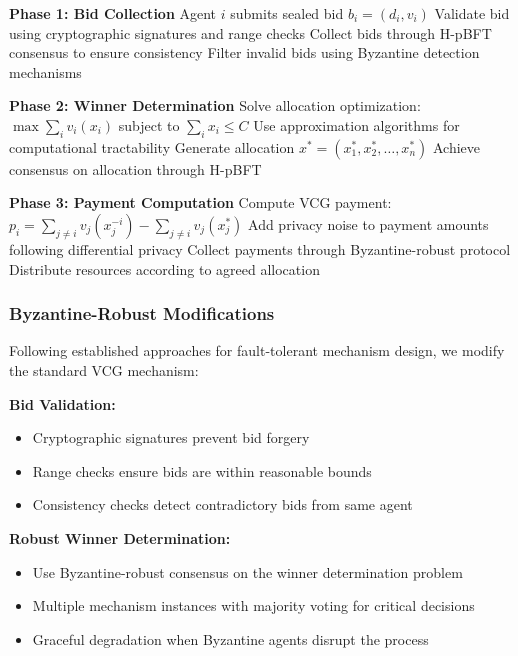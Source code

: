 \documentclass[conference]{IEEEtran}
\begin{document}
\begin{algorithmic}[1]
\STATE \textbf{Phase 1: Bid Collection}
    \STATE Agent $i$ submits sealed bid $b_i = (d_i, v_i)$
    \STATE Validate bid using cryptographic signatures and range checks
\ENDFOR
\STATE Collect bids through H-pBFT consensus to ensure consistency
\STATE Filter invalid bids using Byzantine detection mechanisms

\STATE \textbf{Phase 2: Winner Determination}
\STATE Solve allocation optimization: $\max \sum_i v_i(x_i)$ subject to $\sum_i x_i \leq C$
\STATE Use approximation algorithms for computational tractability
\STATE Generate allocation $x^* = (x_1^*, x_2^*, \ldots, x_n^*)$
\STATE Achieve consensus on allocation through H-pBFT

\STATE \textbf{Phase 3: Payment Computation}
    \STATE Compute VCG payment: $p_i = \sum_{j \neq i} v_j(x_j^{-i}) - \sum_{j \neq i} v_j(x_j^*)$
    \STATE Add privacy noise to payment amounts following differential privacy
\ENDFOR
\STATE Collect payments through Byzantine-robust protocol
\STATE Distribute resources according to agreed allocation
\end{algorithmic}

\subsubsection{Byzantine-Robust Modifications}

Following established approaches for fault-tolerant mechanism design, we modify the standard VCG mechanism:

\textbf{Bid Validation:}
\begin{itemize}
    \item Cryptographic signatures prevent bid forgery
    \item Range checks ensure bids are within reasonable bounds
    \item Consistency checks detect contradictory bids from same agent
\end{itemize}

\textbf{Robust Winner Determination:}
\begin{itemize}
    \item Use Byzantine-robust consensus on the winner determination problem
    \item Multiple mechanism instances with majority voting for critical decisions
    \item Graceful degradation when Byzantine agents disrupt the process
\end{itemize}
\end{document}
